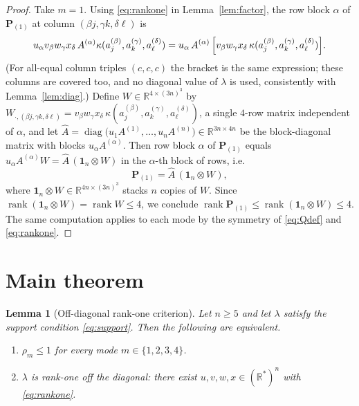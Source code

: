 \documentclass[12pt]{article}
\DeclareMathOperator{\diag}{diag}
\DeclareMathOperator{\rank}{rank}
\newcommand{\bR}{\mathbb{R}}
\newtheorem{lemma}{Lemma}
\theoremstyle{definition}
\begin{document}
\begin{proof}
Take $m=1$.  Using \eqref{eq:rankone} in Lemma~\ref{lem:factor}, the row block
$\alpha$ of $\mathbf P_{(1)}$ at column $(\beta j,\gamma k,\delta\ell)$ is
\[
u_\alpha v_\beta w_\gamma x_\delta\,A^{(\alpha)}\kappa(a^{(\beta)}_j,a^{(\gamma)}_k,a^{(\delta)}_\ell)
=u_\alpha\,A^{(\alpha)}\,\Bigl[v_\beta w_\gamma x_\delta\,\kappa(a^{(\beta)}_j,a^{(\gamma)}_k,a^{(\delta)}_\ell)\Bigr].
\]
(For all-equal column triples $(c,c,c)$ the bracket is the same expression; these
columns are covered too, and no diagonal value of $\lambda$ is used, consistently
with Lemma~\ref{lem:diag}.)  Define $W\in\bR^{4\times(3n)^3}$ by
$W_{\cdot,(\beta j,\gamma k,\delta\ell)}=v_\beta w_\gamma x_\delta\,
\kappa(a^{(\beta)}_j,a^{(\gamma)}_k,a^{(\delta)}_\ell)$, a single $4$-row matrix
independent of $\alpha$, and let
$\widehat A=\diag\bigl(u_1A^{(1)},\dots,u_nA^{(n)}\bigr)\in\bR^{3n\times4n}$ be the
block-diagonal matrix with blocks $u_\alpha A^{(\alpha)}$.  Then row block $\alpha$
of $\mathbf P_{(1)}$ equals $u_\alpha A^{(\alpha)}W=\widehat A\,(\mathbf 1_n\otimes W)$
in the $\alpha$-th block of rows, i.e.
\begin{equation}\label{eq:rank4factor}
\mathbf P_{(1)}=\widehat A\,(\mathbf 1_n\otimes W),
\end{equation}
where $\mathbf 1_n\otimes W\in\bR^{4n\times(3n)^3}$ stacks $n$ copies of $W$.
Since $\rank(\mathbf 1_n\otimes W)=\rank W\le4$, we conclude
$\rank\mathbf P_{(1)}\le\rank(\mathbf 1_n\otimes W)\le4$.  The same computation
applies to each mode by the symmetry of \eqref{eq:Qdef} and \eqref{eq:rankone}.
\end{proof}

\section{Main theorem}

\begin{lemma}[Off-diagonal rank-one criterion]\label{lem:combinatorial}
Let $n\ge 5$ and let $\lambda$ satisfy the support condition \eqref{eq:support}.
Then the following are equivalent.
\begin{enumerate}[label=\textup{(\alph*)}]
\item $\rho_m\le 1$ for every mode $m\in\{1,2,3,4\}$.
\item $\lambda$ is rank-one off the diagonal: there exist $u,v,w,x\in(\bR^*)^n$ with
\eqref{eq:rankone}.
\end{enumerate}
\end{lemma}
\end{document}
